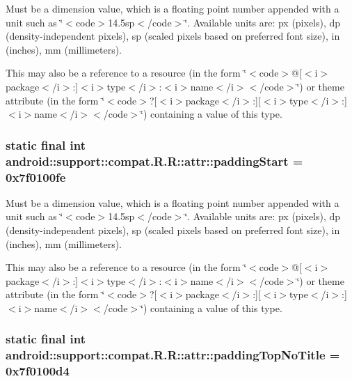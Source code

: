 Must be a dimension value, which is a floating point number appended with a unit such as \char`\"{}$<$code$>$14.5sp$<$/code$>$\char`\"{}. Available units are: px (pixels), dp (density-independent pixels), sp (scaled pixels based on preferred font size), in (inches), mm (millimeters). 

This may also be a reference to a resource (in the form \char`\"{}$<$code$>$@\mbox{[}$<$i$>$package$<$/i$>$:\mbox{]}$<$i$>$type$<$/i$>$:$<$i$>$name$<$/i$>$$<$/code$>$\char`\"{}) or theme attribute (in the form \char`\"{}$<$code$>$?\mbox{[}$<$i$>$package$<$/i$>$:\mbox{]}\mbox{[}$<$i$>$type$<$/i$>$:\mbox{]}$<$i$>$name$<$/i$>$$<$/code$>$\char`\"{}) containing a value of this type. \hypertarget{classandroid_1_1support_1_1compat_1_1_r_1_1attr_31332de34a3f038c0e50a37a3249befa}{
\subsubsection[{paddingStart}]{\setlength{\rightskip}{0pt plus 5cm}static final int android::support::compat.R.R::attr::paddingStart = 0x7f0100fe}}
\label{classandroid_1_1support_1_1compat_1_1_r_1_1attr_31332de34a3f038c0e50a37a3249befa}


Must be a dimension value, which is a floating point number appended with a unit such as \char`\"{}$<$code$>$14.5sp$<$/code$>$\char`\"{}. Available units are: px (pixels), dp (density-independent pixels), sp (scaled pixels based on preferred font size), in (inches), mm (millimeters). 

This may also be a reference to a resource (in the form \char`\"{}$<$code$>$@\mbox{[}$<$i$>$package$<$/i$>$:\mbox{]}$<$i$>$type$<$/i$>$:$<$i$>$name$<$/i$>$$<$/code$>$\char`\"{}) or theme attribute (in the form \char`\"{}$<$code$>$?\mbox{[}$<$i$>$package$<$/i$>$:\mbox{]}\mbox{[}$<$i$>$type$<$/i$>$:\mbox{]}$<$i$>$name$<$/i$>$$<$/code$>$\char`\"{}) containing a value of this type. \hypertarget{classandroid_1_1support_1_1compat_1_1_r_1_1attr_a7a58564234d23b6539a1536364c7907}{
\subsubsection[{paddingTopNoTitle}]{\setlength{\rightskip}{0pt plus 5cm}static final int android::support::compat.R.R::attr::paddingTopNoTitle = 0x7f0100d4}}
\label{classandroid_1_1support_1_1compat_1_1_r_1_1attr_a7a58564234d23b6539a1536364c7907}


